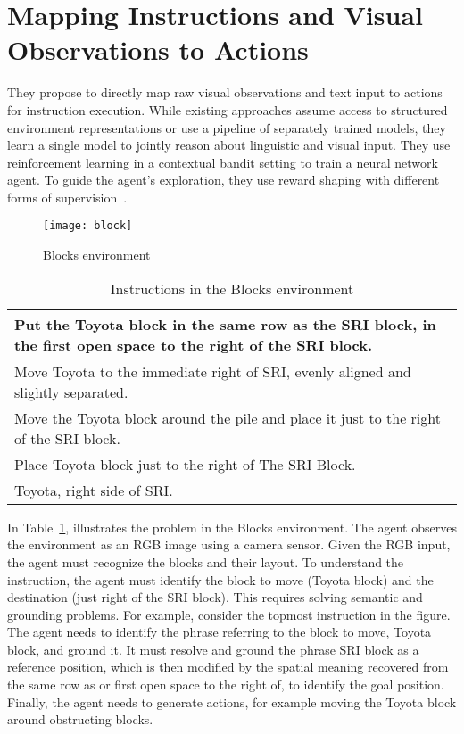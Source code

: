 \section{Mapping Instructions and Visual Observations to Actions~\cite{DBLP:journals/corr/MisraLA17}}
They propose to directly map raw visual observations and text input to actions for instruction execution.  While existing approaches assume access to structured environment representations or use a pipeline of separately trained models, they learn a single model to jointly reason about linguistic and visual input. They use reinforcement learning in a contextual bandit setting to train a neural network agent. To guide the agent’s exploration, they use reward shaping with different forms of supervision~\cite{DBLP:journals/corr/MisraLA17}.

\begin{figure}[htbp]
    \centering
    \texttt{[image: block]}
    \caption{Blocks environment}
\end{figure}
\newpage
\begin{table}[h!]
    \begin{tabular}{|p{15cm}|}
    \hline
    Put the Toyota block in the same row as the SRI block, in the first open space to the right of the SRI block.\\
    \hline
    Move Toyota to the immediate right of SRI, evenly aligned and slightly separated.\\
    \hline
    Move the Toyota block around the pile and place it just to the right of the SRI block.\\
    \hline
    Place Toyota block just to the right of The SRI Block.\\
    \hline
    Toyota, right side of SRI.\\
    \hline
    \end{tabular}
    \caption{Instructions in the Blocks environment}
    \label{tab:1}
\end{table}

In Table~\ref{tab:1}, illustrates the problem in the Blocks environment. The agent observes the environment as an RGB image using a camera sensor. Given the RGB input, the agent must recognize the blocks and their layout. To understand the instruction, the agent must identify the block to move (Toyota block) and the destination (just right of the SRI block). This requires solving semantic and grounding problems. For example, consider the topmost instruction in the figure. The agent needs to identify the phrase referring to the block to move, Toyota block, and ground it. It must resolve and ground the phrase SRI block as a reference position, which is then modified by the spatial meaning recovered from the same row as or first open space to the right of, to identify the goal position. Finally, the agent needs to generate actions, for example moving the Toyota block around obstructing blocks. 

